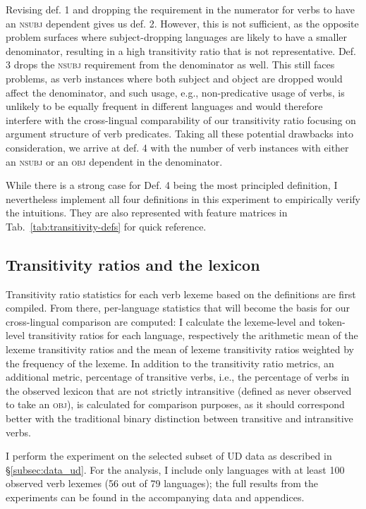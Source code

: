 Revising def. 1 and dropping the requirement in the numerator for verbs to have an \textsc{nsubj} dependent gives us def. 2. However, this is not sufficient, as the opposite problem surfaces where subject-dropping languages are likely to have a smaller denominator, resulting in a high transitivity ratio that is not representative. Def. 3 drops the \textsc{nsubj} requirement from the denominator as well. This still faces problems, as verb instances where both subject and object are dropped would affect the denominator, and such usage, e.g., non-predicative usage of verbs, is unlikely to be equally frequent in different languages and would therefore interfere with the cross-lingual comparability of our transitivity ratio focusing on argument structure of verb predicates. Taking all these potential drawbacks into consideration, we arrive at def. 4 with the number of verb instances with either an \textsc{nsubj} or an \textsc{obj} dependent in the denominator. 



While there is a strong case for Def. 4 being the most principled definition, I nevertheless implement all four definitions in this experiment to empirically verify the intuitions. They are also represented with feature matrices in Tab.~\ref{tab:transitivity-defs} for quick reference.

\subsection{Transitivity ratios and the lexicon}

Transitivity ratio statistics for each verb lexeme based on the definitions are first compiled. From there, per-language statistics that will become the basis for our cross-lingual comparison are computed: I calculate the lexeme-level and token-level transitivity ratios for each language, respectively the arithmetic mean of the lexeme transitivity ratios and the mean of lexeme transitivity ratios weighted by the frequency of the lexeme. In addition to the transitivity ratio metrics, an additional metric, percentage of transitive verbs, i.e., the percentage of verbs in the observed lexicon that are not strictly intransitive (defined as never observed to take an \textsc{obj}), is calculated for comparison purposes, as it should correspond better with the traditional binary distinction between transitive and intransitive verbs.

I perform the experiment on the selected subset of UD data as described in §\ref{subsec:data_ud}. For the analysis, I include only languages with at least 100 observed verb lexemes (56 out of 79 languages); the full results from the experiments can be found in the accompanying data and appendices. 

